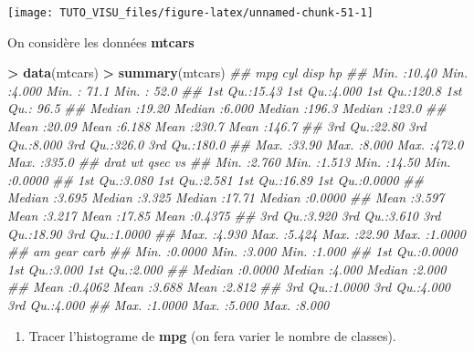 \documentclass[]{article}
\newenvironment{Shaded}{\begin{snugshade}}{\end{snugshade}}
\newcommand{\CommentTok}[1]{\textcolor[rgb]{0.56,0.35,0.01}{\textit{#1}}}
\newcommand{\KeywordTok}[1]{\textcolor[rgb]{0.13,0.29,0.53}{\textbf{#1}}}
\newcommand{\NormalTok}[1]{#1}
\newcommand{\OperatorTok}[1]{\textcolor[rgb]{0.81,0.36,0.00}{\textbf{#1}}}
\newcommand{\StringTok}[1]{\textcolor[rgb]{0.31,0.60,0.02}{#1}}
\providecommand{\tightlist}{%
  \setlength{\itemsep}{0pt}\setlength{\parskip}{0pt}}
\theoremstyle{definition}
\theoremstyle{definition}
\theoremstyle{definition}
\theoremstyle{remark}
\let\BeginKnitrBlock\begin \let\EndKnitrBlock\end
\begin{document}
\begin{center}\texttt{[image: TUTO\_VISU\_files/figure-latex/unnamed-chunk-51-1]} \end{center}

\BeginKnitrBlock{exercise}[Différents graphes]
\protect\hypertarget{exr:exo-mtcars}{}{\label{exr:exo-mtcars} \iffalse (Différents graphes) \fi{} }
\EndKnitrBlock{exercise}

On considère les données \textbf{mtcars}

\begin{Shaded}
\begin{Highlighting}[]
\OperatorTok{>}\StringTok{ }\KeywordTok{data}\NormalTok{(mtcars)}
\OperatorTok{>}\StringTok{ }\KeywordTok{summary}\NormalTok{(mtcars)}
\CommentTok{##       mpg             cyl             disp             hp       }
\CommentTok{##  Min.   :10.40   Min.   :4.000   Min.   : 71.1   Min.   : 52.0  }
\CommentTok{##  1st Qu.:15.43   1st Qu.:4.000   1st Qu.:120.8   1st Qu.: 96.5  }
\CommentTok{##  Median :19.20   Median :6.000   Median :196.3   Median :123.0  }
\CommentTok{##  Mean   :20.09   Mean   :6.188   Mean   :230.7   Mean   :146.7  }
\CommentTok{##  3rd Qu.:22.80   3rd Qu.:8.000   3rd Qu.:326.0   3rd Qu.:180.0  }
\CommentTok{##  Max.   :33.90   Max.   :8.000   Max.   :472.0   Max.   :335.0  }
\CommentTok{##       drat             wt             qsec             vs        }
\CommentTok{##  Min.   :2.760   Min.   :1.513   Min.   :14.50   Min.   :0.0000  }
\CommentTok{##  1st Qu.:3.080   1st Qu.:2.581   1st Qu.:16.89   1st Qu.:0.0000  }
\CommentTok{##  Median :3.695   Median :3.325   Median :17.71   Median :0.0000  }
\CommentTok{##  Mean   :3.597   Mean   :3.217   Mean   :17.85   Mean   :0.4375  }
\CommentTok{##  3rd Qu.:3.920   3rd Qu.:3.610   3rd Qu.:18.90   3rd Qu.:1.0000  }
\CommentTok{##  Max.   :4.930   Max.   :5.424   Max.   :22.90   Max.   :1.0000  }
\CommentTok{##        am              gear            carb      }
\CommentTok{##  Min.   :0.0000   Min.   :3.000   Min.   :1.000  }
\CommentTok{##  1st Qu.:0.0000   1st Qu.:3.000   1st Qu.:2.000  }
\CommentTok{##  Median :0.0000   Median :4.000   Median :2.000  }
\CommentTok{##  Mean   :0.4062   Mean   :3.688   Mean   :2.812  }
\CommentTok{##  3rd Qu.:1.0000   3rd Qu.:4.000   3rd Qu.:4.000  }
\CommentTok{##  Max.   :1.0000   Max.   :5.000   Max.   :8.000}
\end{Highlighting}
\end{Shaded}

\begin{enumerate}
\def\labelenumi{\arabic{enumi}.}
\tightlist
\item
  Tracer l'histograme de \textbf{mpg} (on fera varier le nombre de classes).
\end{enumerate}
\end{document}
